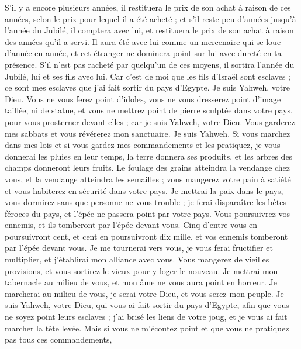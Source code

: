 \begin{multicols}{2}
S'il y a encore plusieurs années, il restituera le prix de son achat à raison de ces années, selon le prix pour lequel il a été acheté ;
et s'il reste peu d'années jusqu'à l'année du Jubilé, il comptera avec lui, et restituera le prix de son achat à raison des années qu'il a servi.
Il aura été avec lui comme un mercenaire qui se loue d'année en année, et cet étranger ne dominera point sur lui avec dureté en ta présence.
S'il n'est pas racheté par quelqu'un de ces moyens, il sortira l'année du Jubilé, lui et ses fils avec lui.
Car c’est de moi que les fils d'Israël sont esclaves ; ce sont mes esclaves que j'ai fait sortir du pays d'Egypte. Je suis Yahweh, votre Dieu.
\VerseOne{}Vous ne vous ferez point d'idoles, vous ne vous dresserez point d'image taillée, ni de statue, et vous ne mettrez point de pierre sculptée dans votre pays, pour vous prosterner devant elles ; car je suis Yahweh, votre Dieu.
Vous garderez mes sabbats et vous révérerez mon sanctuaire. Je suis Yahweh.
Si vous marchez dans mes lois et si vous gardez mes commandements et les pratiquez,
je vous donnerai les pluies en leur temps, la terre donnera ses produits, et les arbres des champs donneront leurs fruits.
Le foulage des grains atteindra la vendange chez vous, et la vendange atteindra les semailles ; vous mangerez votre pain à satiété et vous habiterez en sécurité dans votre pays.
Je mettrai la paix dans le pays, vous dormirez sans que personne ne vous trouble ; je ferai disparaître les bêtes féroces du pays, et l'épée ne passera point par votre pays.
Vous poursuivrez vos ennemis, et ils tomberont par l'épée devant vous.
Cinq d'entre vous en poursuivront cent, et cent en poursuivront dix mille, et vos ennemis tomberont par l'épée devant vous.
Je me tournerai vers vous, je vous ferai fructifier et multiplier, et j'établirai mon alliance avec vous.
Vous mangerez de vieilles provisions, et vous sortirez le vieux pour y loger le nouveau.
Je mettrai mon tabernacle au milieu de vous, et mon âme ne vous aura point en horreur.
Je marcherai au milieu de vous, je serai votre Dieu, et vous serez mon peuple.
Je suis Yahweh, votre Dieu, qui vous ai fait sortir du pays d'Egypte, afin que vous ne soyez point leurs esclaves ; j'ai brisé les liens de votre joug, et je vous ai fait marcher la tête levée.
Mais si vous ne m'écoutez point et que vous ne pratiquez pas tous ces commandements,

\end{multicols}
